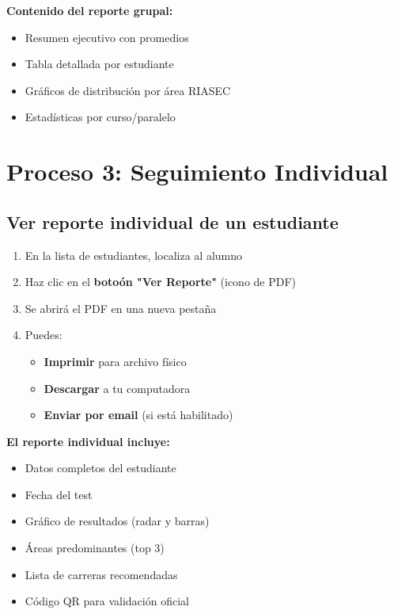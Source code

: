 \documentclass[12pt, a4paper]{report}
\begin{document}
\textbf{Contenido del reporte grupal:}
\begin{itemize}
    \item Resumen ejecutivo con promedios
    \item Tabla detallada por estudiante
    \item Gráficos de distribución por área RIASEC
    \item Estadísticas por curso/paralelo
\end{itemize}

\section{Proceso 3: Seguimiento Individual}

\subsection{Ver reporte individual de un estudiante}
\begin{enumerate}
    \item En la lista de estudiantes, localiza al alumno
    \item Haz clic en el \textbf{botoón "Ver Reporte"} (icono de PDF)
    \item Se abrirá el PDF en una nueva pestaña
    \item Puedes:
    \begin{itemize}
        \item \textbf{Imprimir} para archivo físico
        \item \textbf{Descargar} a tu computadora
        \item \textbf{Enviar por email} (si está habilitado)
    \end{itemize}
\end{enumerate}

\textbf{El reporte individual incluye:}
\begin{itemize}
    \item Datos completos del estudiante
    \item Fecha del test
    \item Gráfico de resultados (radar y barras)
    \item Áreas predominantes (top 3)
    \item Lista de carreras recomendadas
    \item Código QR para validación oficial
\end{itemize}
\end{document}
